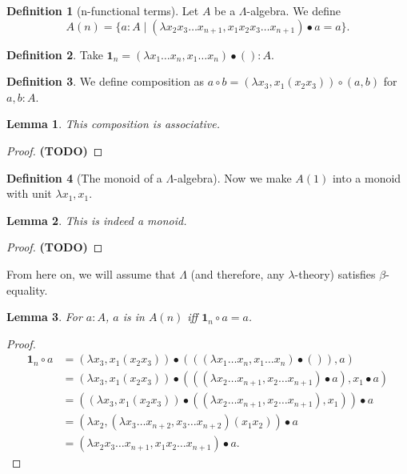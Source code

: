 \documentclass[a4paper]{amsbook}
\newtheorem{lemma}{Lemma}
\theoremstyle{definition}
\newtheorem{definition}{Definition}
\theoremstyle{remark}
\newcommand\TODO{\textbf{(TODO)} }
\begin{document}
  \begin{definition}[n-functional terms]
    Let $ A $ be a $ \Lambda $-algebra. We define
    \[ A(n) = \{ a : A \mid (\lambda x_2 x_3 \dots x_{n + 1}, x_1 x_2 x_3 \dots x_{n + 1}) \bullet a = a \}. \]
  \end{definition}

  \begin{definition}
    Take $ \mathbf 1_n = (\lambda x_1 \dots x_n, x_1 \dots x_n) \bullet () : A $.
  \end{definition}

  \begin{definition}
    We define composition as $ a \circ b = (\lambda x_3, x_1 (x_2 x_3)) \circ (a, b) $ for $ a, b : A $.
  \end{definition}

  \begin{lemma}
    This composition is associative.
  \end{lemma}
  \begin{proof}
    \TODO
  \end{proof}

  \begin{definition}[The monoid of a $ \Lambda $-algebra]
    Now we make $ A(1) $ into a monoid with unit $ \lambda x_1, x_1 $.
  \end{definition}

  \begin{lemma}
    This is indeed a monoid.
  \end{lemma}
  \begin{proof}
    \TODO
  \end{proof}

  From here on, we will assume that $ \Lambda $ (and therefore, any $ \lambda $-theory) satisfies $ \beta $-equality.

  \begin{lemma}
    For $ a: A $, $ a $ is in $ A(n) $ iff $ \mathbf 1_n \circ a = a $.
  \end{lemma}
  \begin{proof}
    \begin{align*}
      \mathbf 1_n \circ a
      &= (\lambda x_3, x_1 (x_2 x_3)) \bullet (((\lambda x_1 \dots x_n, x_1 \dots x_n) \bullet ()), a)\\
      &= (\lambda x_3, x_1 (x_2 x_3)) \bullet (((\lambda x_2 \dots x_{n + 1}, x_2 \dots x_{n + 1}) \bullet a), x_1 \bullet a)\\
      &= ((\lambda x_3, x_1 (x_2 x_3)) \bullet ((\lambda x_2 \dots x_{n + 1}, x_2 \dots x_{n + 1}), x_1)) \bullet a\\
      &= (\lambda x_2, (\lambda x_3 \dots x_{n + 2}, x_3 \dots x_{n + 2}) (x_1 x_2)) \bullet a\\
      &= (\lambda x_2 x_3 \dots x_{n + 1}, x_1 x_2 \dots x_{n + 1}) \bullet a.
    \end{align*}
  \end{proof}
\end{document}
